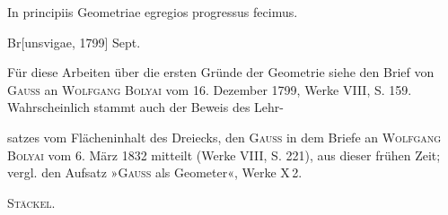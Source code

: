 \indent In principiis Geometriae egregios progressus fecimus.
\par\noindent\hfill Br[unsvigae, 1799] Sept.

\medskip\begingroup\small
\indent Für diese Arbeiten über die ersten Gründe der Geometrie siehe den Brief von \textsc{Gauss} an \textsc{Wolfgang Bolyai} vom 16. Dezember 1799, Werke VIII, S. 159. Wahrscheinlich stammt auch der Beweis des Lehr-
\par\endgroup

\clearpage{}
\begingroup\small
\noindent satzes vom Flächeninhalt des Dreiecks, den \textsc{Gauss} in dem Briefe an \textsc{Wolfgang Bolyai} vom 6. März 1832 mitteilt (Werke VIII, S. 221), aus dieser frühen Zeit; vergl. den Aufsatz »\textsc{Gauss} als Geometer«, Werke X\,2.
\par\noindent\hfill\textsc{Stäckel.}
\par\endgroup
